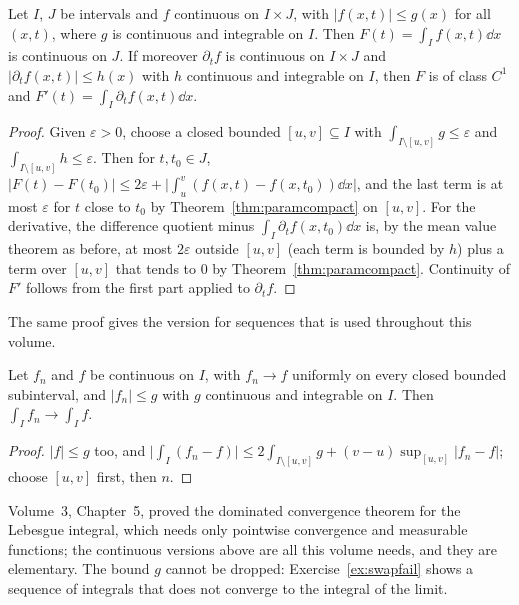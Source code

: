 \begin{theorem}[domination]\label{thm:domination}
Let $I$, $J$ be intervals and $f$ continuous on $I\times J$, with $|f(x,t)|\le g(x)$ for all $(x,t)$, where $g$ is continuous and
integrable on $I$. Then $F(t)=\int_If(x,t)\dd x$ is continuous on $J$. If moreover $\partial_tf$ is continuous on $I\times J$ and
$|\partial_tf(x,t)|\le h(x)$ with $h$ continuous and integrable on $I$, then $F$ is of class $C^1$ and $F'(t)=\int_I\partial_tf(x,t)\dd x$.
\end{theorem}
\begin{proof}
Given $\varepsilon>0$, choose a closed bounded $[u,v]\subseteq I$ with $\int_{I\setminus[u,v]}g\le\varepsilon$ and $\int_{I\setminus[u,v]}h\le\varepsilon$. Then
for $t,t_0\in J$, $|F(t)-F(t_0)|\le2\varepsilon+\bigl|\int_u^v(f(x,t)-f(x,t_0))\dd x\bigr|$, and the last term is at most $\varepsilon$ for $t$ close to
$t_0$ by Theorem~\ref{thm:paramcompact} on $[u,v]$. For the derivative, the difference quotient minus $\int_I\partial_tf(x,t_0)\dd x$
is, by the mean value theorem as before, at most $2\varepsilon$ outside $[u,v]$ (each term is bounded by $h$) plus a term over $[u,v]$
that tends to $0$ by Theorem~\ref{thm:paramcompact}. Continuity of $F'$ follows from the first part applied to $\partial_tf$.
\end{proof}

The same proof gives the version for sequences that is used throughout this volume.

\begin{corollary}\label{cor:dct}
Let $f_n$ and $f$ be continuous on $I$, with $f_n\to f$ uniformly on every closed bounded subinterval, and $|f_n|\le g$ with $g$
continuous and integrable on $I$. Then $\int_If_n\to\int_If$.
\end{corollary}
\begin{proof}
$|f|\le g$ too, and $\bigl|\int_I(f_n-f)\bigr|\le2\int_{I\setminus[u,v]}g+(v-u)\sup_{[u,v]}|f_n-f|$; choose $[u,v]$ first, then $n$.
\end{proof}

\begin{remark}
Volume~3, Chapter~5, proved the dominated convergence theorem for the Lebesgue integral, which needs only pointwise
convergence and measurable functions; the continuous versions above are all this volume needs, and they are elementary. The
bound $g$ cannot be dropped: Exercise~\ref{ex:swapfail} shows a sequence of integrals that does not converge to the integral of
the limit.
\end{remark}

